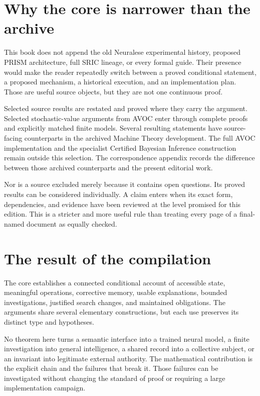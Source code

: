 \section{Why the core is narrower than the archive}
This book does not append the old Neuralese experimental history, proposed PRISM architecture, full SRIC lineage, or every formal guide. Their presence would make the reader repeatedly switch between a proved conditional statement, a proposed mechanism, a historical execution, and an implementation plan. Those are useful source objects, but they are not one continuous proof.

Selected source results are restated and proved where they carry the argument. Selected stochastic-value arguments from AVOC enter through complete proofs and explicitly matched finite models. Several resulting statements have source-facing counterparts in the archived Machine Theory development. The full AVOC implementation and the specialist Certified Bayesian Inference construction remain outside this selection. The correspondence appendix records the difference between those archived counterparts and the present editorial work.

Nor is a source excluded merely because it contains open questions. Its proved results can be considered individually. A claim enters when its exact form, dependencies, and evidence have been reviewed at the level promised for this edition. This is a stricter and more useful rule than treating every page of a final-named document as equally checked.

\section{The result of the compilation}
The core establishes a connected conditional account of accessible state, meaningful operations, corrective memory, usable explanations, bounded investigations, justified search changes, and maintained obligations. The arguments share several elementary constructions, but each use preserves its distinct type and hypotheses.

No theorem here turns a semantic interface into a trained neural model, a finite investigation into general intelligence, a shared record into a collective subject, or an invariant into legitimate external authority. The mathematical contribution is the explicit chain and the failures that break it. Those failures can be investigated without changing the standard of proof or requiring a large implementation campaign.


